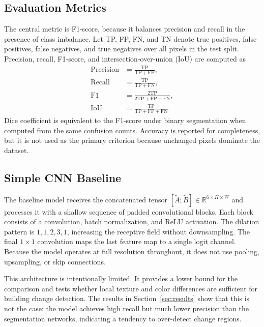 \documentclass[11pt,a4paper]{article}
\begin{document}
\subsection{Evaluation Metrics}

The central metric is F1-score, because it balances precision and recall in the presence of class imbalance. Let TP, FP, FN, and TN denote true positives, false positives, false negatives, and true negatives over all pixels in the test split. Precision, recall, F1-score, and intersection-over-union (IoU) are computed as
\begin{align}
  \mathrm{Precision} &= \frac{\mathrm{TP}}{\mathrm{TP}+\mathrm{FP}},\\
  \mathrm{Recall} &= \frac{\mathrm{TP}}{\mathrm{TP}+\mathrm{FN}},\\
  \mathrm{F1} &= \frac{2\mathrm{TP}}{2\mathrm{TP}+\mathrm{FP}+\mathrm{FN}},\\
  \mathrm{IoU} &= \frac{\mathrm{TP}}{\mathrm{TP}+\mathrm{FP}+\mathrm{FN}}.
\end{align}
Dice coefficient is equivalent to the F1-score under binary segmentation when computed from the same confusion counts. Accuracy is reported for completeness, but it is not used as the primary criterion because unchanged pixels dominate the dataset.

\subsection{Simple CNN Baseline}

The baseline model receives the concatenated tensor $[\tilde{A};\tilde{B}] \in \mathbb{R}^{6 \times H \times W}$ and processes it with a shallow sequence of padded convolutional blocks. Each block consists of a convolution, batch normalization, and ReLU activation. The dilation pattern is $1,1,2,3,1$, increasing the receptive field without downsampling. The final $1 \times 1$ convolution maps the last feature map to a single logit channel. Because the model operates at full resolution throughout, it does not use pooling, upsampling, or skip connections.

This architecture is intentionally limited. It provides a lower bound for the comparison and tests whether local texture and color differences are sufficient for building change detection. The results in Section~\ref{sec:results} show that this is not the case: the model achieves high recall but much lower precision than the segmentation networks, indicating a tendency to over-detect change regions.
\end{document}
